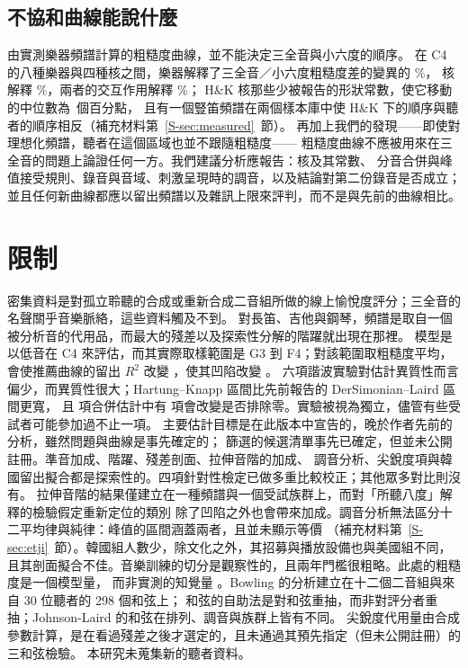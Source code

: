 \documentclass[11pt,a4paper]{article}
\newcommand{\HK}{H\&K}
\newcommand{\pp}{\,個百分點}
\begin{document}
\subsection{不協和曲線能說什麼}
由實測樂器頻譜計算的粗糙度曲線，並不能決定三全音與小六度的順序。
在 C4 的八種樂器與四種核之間，樂器解釋了三全音／小六度粗糙度差的變異的 \shareInstrNoV\%，
核解釋 \shareModelNoV\%，兩者的交互作用解釋 \shareInterNoV\%；
\HK{} 核那些少被報告的形狀常數，使它移動的中位數為 \sensABNarrowMed\pp，
且有一個豎笛頻譜在兩個樣本庫中使 \HK{} 下的順序與聽者的順序相反（補充材料第~\ref{S-sec:measured}~節）。
再加上我們的發現——即使對理想化頻譜，聽者在這個區域也並不跟隨粗糙度——
粗糙度曲線不應被用來在三全音的問題上論證任何一方。我們建議分析應報告：核及其常數、
分音合併與峰值接受規則、錄音與音域、刺激呈現時的調音，以及結論對第二份錄音是否成立；
並且任何新曲線都應以留出頻譜以及雜訊上限來評判，而不是與先前的曲線相比。

\section{限制}
密集資料是對孤立聆聽的合成或重新合成二音組所做的線上愉悅度評分；三全音的名聲關乎音樂脈絡，這些資料觸及不到。
對長笛、吉他與鋼琴，頻譜是取自一個被分析音的代用品，而最大的殘差以及探索性分解的階躍就出現在那裡。
模型是以低音在 C4 來評估，而其實際取樣範圍是 G3 到 F4；對該範圍取粗糙度平均，
會使推薦曲線的留出 $R^2$ 改變 \rbdRtwoRegVsHKHtw{}，使其凹陷改變 \rbdDipRegVsHKHtw。
六項諧波實驗對估計異質性而言偏少，而異質性很大；Hartung--Knapp 區間比先前報告的 DerSimonian--Laird 區間更寬，
且 \reNest{} 項合併估計中有 \reNflip{} 項會改變是否排除零。實驗被視為獨立，儘管有些受試者可能參加過不止一項。
主要估計目標是在此版本中宣告的，晚於作者先前的分析，雖然問題與曲線是事先確定的；
篩選的候選清單事先已確定，但並未公開註冊。準音加成、階躍、殘差剖面、拉伸音階的加成、
調音分析、尖銳度項與韓國留出擬合都是探索性的。四項針對性檢定已做多重比較校正；其他眾多對比則沒有。
拉伸音階的結果僅建立在一種頻譜與一個受試族群上，而對「所聽八度」解釋的檢驗假定重新定位的類別
除了凹陷之外也會帶來加成。調音分析無法區分十二平均律與純律：峰值的區間涵蓋兩者，且並未顯示等價
（補充材料第~\ref{S-sec:etji}~節）。韓國組人數少，除文化之外，其招募與播放設備也與美國組不同，
且其剖面擬合不佳。音樂訓練的切分是觀察性的，且兩年門檻很粗略。此處的粗糙度是一個模型量，
而非實測的知覺量 \citep{mcbride2025}。Bowling 的分析建立在十二個二音組與來自 30 位聽者的 298 個和弦上；
和弦的自助法是對和弦重抽，而非對評分者重抽；Johnson-Laird 的和弦在排列、調音與族群上皆有不同。
尖銳度代用量由合成參數計算，是在看過殘差之後才選定的，且未通過其預先指定（但未公開註冊）的三和弦檢驗。
本研究未蒐集新的聽者資料。
\end{document}
